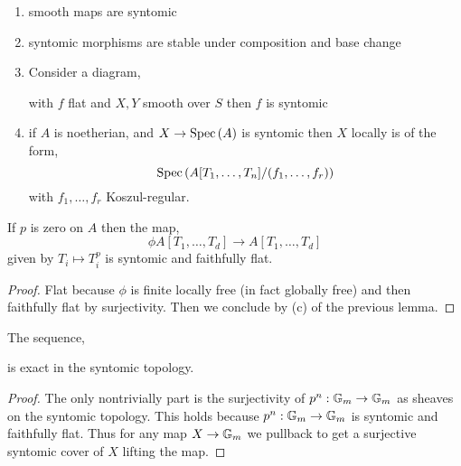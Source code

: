 \documentclass[12pt]{article}
\begin{document}
\begin{lemma}
\begin{enumerate}
\item smooth maps are syntomic
\item syntomic morphisms are stable under composition and base change
\item Consider a diagram,
\begin{center}
\end{center}
with $f$ flat and $X,Y$ smooth over $S$ then $f$ is syntomic

\item if $A$ is noetherian, and $X \to \mathrm{Spec}\left( A \right)$ is syntomic then $X$ locally is of the form,
\[ \mathrm{Spec}\left( A[T_1, \dots, T_n]/(f_1, \dots, f_r) \right) \]
with $f_1, \dots, f_r$ Koszul-regular. 
\end{enumerate}
\end{lemma}

\begin{cor}
If $p$ is zero on $A$ then the map,
\[ \phi A[T_1, \dots, T_d] \to A[T_1, \dots, T_d] \]
given by $T_i \mapsto T_{i}^p$ is syntomic and faithfully flat.
\end{cor}

\begin{proof}
Flat because $\phi$ is finite locally free (in fact globally free) and then faithfully flat by surjectivity. Then we conclude by (c) of the previous lemma.
\end{proof}

\begin{cor}
The sequence,
\begin{center}
\end{center}
is exact in the syntomic topology. 
\end{cor}

\begin{proof}
The only nontrivially part is the surjectivity of $p^n : \mathbb{G}_m \to \mathbb{G}_m$ as sheaves on the syntomic topology. This holds because $p^n : \mathbb{G}_m \to \mathbb{G}_m$ is syntomic and faithfully flat. Thus for any map $X \to \mathbb{G}_m$ we pullback to get a surjective syntomic cover of $X$ lifting the map. 
\end{proof}
\end{document}

